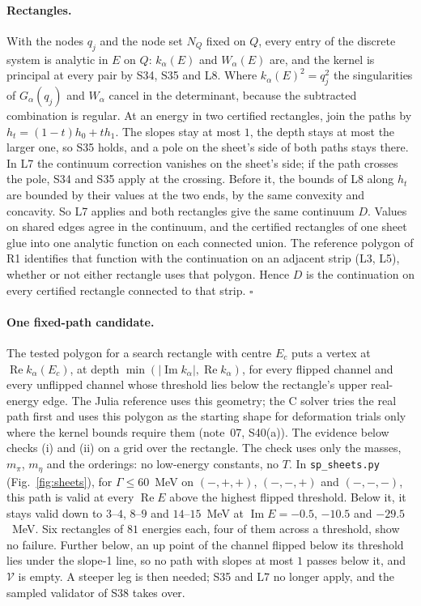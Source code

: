 \documentclass[11pt]{article}
\newcommand{\file}[1]{\nolinkurl{#1}}
\begin{document}
\paragraph{Rectangles.} With the nodes $q_j$ and the node set $N_Q$ fixed on $Q$, every entry of the discrete system is analytic in $E$ on $Q$: $k_\alpha(E)$ and $W_\alpha(E)$ are, and the kernel is principal at every pair by S34, S35 and L8. Where $k_\alpha(E)^2=q_j^2$ the singularities of $G_\alpha(q_j)$ and $W_\alpha$ cancel in the determinant, because the subtracted combination is regular. At an energy in two certified rectangles, join the paths by $h_t=(1-t)h_0+th_1$. The slopes stay at most $1$, the depth stays at most the larger one, so S35 holds, and a pole on the sheet's side of both paths stays there. In L7 the continuum correction vanishes on the sheet's side; if the path crosses the pole, S34 and S35 apply at the crossing. Before it, the bounds of L8 along $h_t$ are bounded by their values at the two ends, by the same convexity and concavity. So L7 applies and both rectangles give the same continuum $D$. Values on shared edges agree in the continuum, and the certified rectangles of one sheet glue into one analytic function on each connected union. The reference polygon of R1 identifies that function with the continuation on an adjacent strip (L3, L5), whether or not either rectangle uses that polygon. Hence $D$ is the continuation on every certified rectangle connected to that strip. $\square$

\paragraph{One fixed-path candidate.} The tested polygon for a search rectangle with centre $E_c$ puts a vertex at $\operatorname{Re}k_\alpha(E_c)$, at depth $\min(|\operatorname{Im}k_\alpha|,\operatorname{Re}k_\alpha)$, for every flipped channel and every unflipped channel whose threshold lies below the rectangle's upper real-energy edge. The Julia reference uses this geometry; the C solver tries the real path first and uses this polygon as the starting shape for deformation trials only where the kernel bounds require them (note~07, S40(a)). The evidence below checks (i) and (ii) on a grid over the rectangle. The check uses only the masses, $m_\pi$, $m_\eta$ and the orderings: no low-energy constants, no $T$. In \file{sp_sheets.py} (Fig.~\ref{fig:sheets}), for $\Gamma\le60$~MeV on $(-,+,+)$, $(-,-,+)$ and $(-,-,-)$, this path is valid at every $\operatorname{Re}E$ above the highest flipped threshold. Below it, it stays valid down to $3$--$4$, $8$--$9$ and $14$--$15$~MeV at $\operatorname{Im}E=-0.5$, $-10.5$ and $-29.5$~MeV. Six rectangles of $81$ energies each, four of them across a threshold, show no failure. Further below, an up point of the channel flipped below its threshold lies under the slope-1 line, so no path with slopes at most $1$ passes below it, and $\mathcal V$ is empty. A steeper leg is then needed; S35 and L7 no longer apply, and the sampled validator of S38 takes over.
\end{document}
